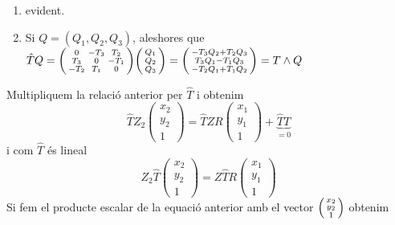 \documentclass[../main.tex]{subfiles}
\begin{document}
	\begin{demostracio}
		\begin{enumerate}
			\item evident.
			\item Si $Q = (Q_1, Q_2, Q_3)$, aleshores que $\hat{T}Q = \begin{psmallmatrix}0 & -T_3 & T_2\\
			T_3 & 0 & -T_1\\
			-T_2 & T_1 & 0\end{psmallmatrix}\begin{psmallmatrix}Q_1\\Q_2\\Q_3\end{psmallmatrix} = \begin{psmallmatrix}-T_3Q_2 + T_2Q_3\\T_3Q_1 - T_1Q_3\\-T_2Q_1 + T_1Q_2\end{psmallmatrix} = T \wedge Q$
		\end{enumerate}
	\end{demostracio}
	Multipliquem la relació anterior per $\hat{T}$ i obtenim
	\begin{displaymath}
		\hat{T}Z_2 \begin{pmatrix}
			x_2\\y_2\\1
		\end{pmatrix}
		=
		\hat{T}ZR \begin{pmatrix}
			x_1\\y_1\\1
		\end{pmatrix}
		+ \underbrace{\hat{T} T}_{= 0}
	\end{displaymath}
	i com $\hat{T}$ és lineal
	\begin{displaymath}
		Z_2\hat{T}\begin{pmatrix}
			x_2\\y_2\\1
		\end{pmatrix}
		=
		Z\hat{T}R\begin{pmatrix}
			x_1\\y_1\\1
		\end{pmatrix}
	\end{displaymath}
	Si fem el producte escalar de la equació anterior amb el vector $\begin{psmallmatrix}x_2\\y_2\\1\end{psmallmatrix}$ obtenim
\end{document}
